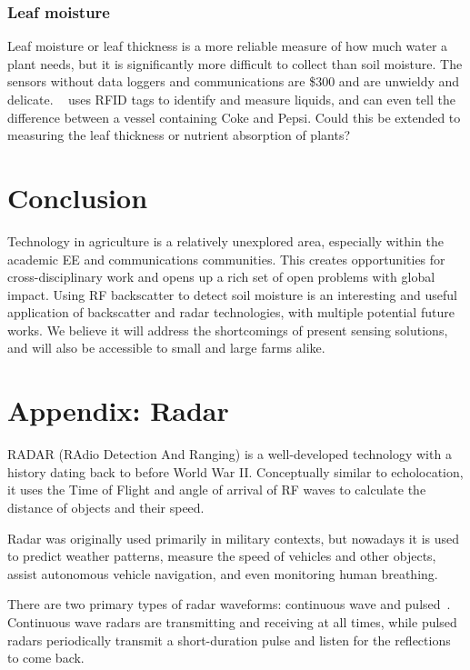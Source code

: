 \documentclass[12pt]{article}
\begin{document}
\subsubsection*{Leaf moisture}
Leaf moisture or leaf thickness is a more reliable measure of how much
water a plant needs, but it is significantly more difficult to collect
than soil moisture. The sensors without data loggers and
communications are \$300 and are unwieldy and
delicate. ~\cite{Wang2017} uses RFID tags to identify and measure
liquids, and can even tell the difference between a vessel containing
Coke and Pepsi. Could this be extended to measuring the leaf thickness
or nutrient absorption of plants?


\section*{Conclusion}
Technology in agriculture is a relatively unexplored area, especially
within the academic EE and communications communities. This creates
opportunities for cross-disciplinary work and opens up a rich set of
open problems with global impact. Using RF backscatter to detect
soil moisture is an interesting and useful application of backscatter
and radar technologies, with multiple potential future works. We
believe it will address the shortcomings of present sensing solutions,
and will also be accessible to small and large farms alike.


\begin{footnotesize}
  
\end{footnotesize}

\section*{Appendix: Radar}
RADAR (RAdio Detection And Ranging) is a well-developed technology
with a history dating back to before World War II. Conceptually
similar to echolocation, it uses the Time of Flight and angle of
arrival of RF waves to calculate the distance of objects and their
speed.

Radar was originally used primarily in military contexts, but nowadays
it is used to predict weather patterns, measure the speed of vehicles
and other objects, assist autonomous vehicle navigation, and even
monitoring human breathing.

There are two primary types of radar waveforms: continuous wave and
pulsed~\cite{Richards2010}. Continuous wave radars are transmitting
and receiving at all times, while pulsed radars periodically transmit a
short-duration pulse and listen for the reflections to come back.
\end{document}
